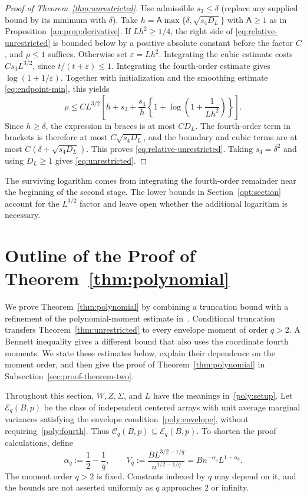 \documentclass[11pt,letterpaper]{article}
\theoremstyle{remark}
\begin{document}
\begin{proof}[Proof of Theorem~\ref{thm:unrestricted}]
Use admissible $s_3\le\delta$ (replace any supplied bound by its minimum with $\delta$). Take $h=\mathsf A\max\{\delta,\sqrt{s_4D_L}\}$ with $\mathsf A\ge1$ as in Proposition~\ref{an:prop:derivative}. If $Lh^2\ge1/4$, the right side of \eqref{eq:relative-unrestricted} is bounded below by a positive absolute constant before the factor $C$, and $\rho\le1$ suffices. Otherwise set $\varepsilon=Lh^2$. Integrating the cubic estimate costs $Cs_3L^{3/2}$, since $t/(t+\varepsilon)\le1$. Integrating the fourth-order estimate gives $\log(1+1/\varepsilon)$. Together with initialization and the smoothing estimate \eqref{eq:endpoint-min}, this yields
\[
 \rho\le C L^{3/2}\left[h+s_3+
 \frac{s_4}{h}\left\{1+\log\!\left(1+\frac1{Lh^2}\right)\right\}\right].
\]
Since $h\ge\delta$, the expression in braces is at most $C D_L$. The fourth-order term in brackets is therefore at most $C\sqrt{s_4D_L}$, and the boundary and cubic terms are at most $C(\delta+\sqrt{s_4D_L})$. This proves \eqref{eq:relative-unrestricted}. Taking $s_4=\delta^2$ and using $D_L\ge1$ gives \eqref{eq:unrestricted}.
\end{proof}

The surviving logarithm comes from integrating the fourth-order
remainder near the beginning of the second stage. The lower bounds in
Section~\ref{opt:section} account for the \(L^{3/2}\) factor and leave
open whether the additional logarithm is necessary.

\section{Outline of the Proof of Theorem~\ref*{thm:polynomial}}\label{sec:poly}

We prove Theorem~\ref{thm:polynomial} by combining a truncation bound
with a refinement of the polynomial-moment estimate in~\cite{CCKK2022}.
Conditional truncation transfers Theorem~\ref{thm:unrestricted} to
every envelope moment of order \(q>2\). A Bennett inequality gives a
different bound that also uses the coordinate fourth moments.
We state these estimates below, explain their dependence on the moment
order, and then give the proof of Theorem~\ref{thm:polynomial} in
Subsection~\ref{sec:proof-theorem-two}.

Throughout this section, \(W,Z,\Sigma\), and \(L\) have the meanings
in~\eqref{poly:setup}. Let \(\mathcal E_q(B,p)\) be the class of
independent centered arrays with unit average marginal variances
satisfying the envelope condition~\eqref{poly:envelope}, without
requiring~\eqref{poly:fourth}. Thus
\(\mathcal C_q(B,p)\subseteq\mathcal E_q(B,p)\).
To shorten the proof calculations, define
\begin{equation}
 \alpha_q:=\frac12-\frac1q,\qquad
 V_q:=\frac{B L^{3/2-1/q}}{n^{1/2-1/q}}
      =Bn^{-\alpha_q}L^{1+\alpha_q}.
 \label{poly:rates}
\end{equation}
The moment order \(q>2\) is fixed. Constants indexed by \(q\)
may depend on it, and the bounds are not asserted uniformly as
\(q\) approaches \(2\) or infinity.
\end{document}
